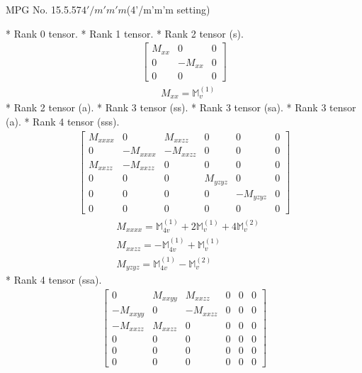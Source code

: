 \documentclass[fleqn,8pt,landscape]{jsarticle}
\begin{document}
\setcounter{MaxMatrixCols}{32}

\renewcommand{\tablename}{Table~}
\renewcommand{\figurename}{Figure~}
\begin{center}
\LARGE
MPG No. 15.5.57\quad$4'/m'm'm$\quad(4'/m'm'm setting)
\end{center}
* Rank 0 tensor.
* Rank 1 tensor.
* Rank 2 tensor (s).
\begin{align*}
\begin{bmatrix} M_{xx} & 0 & 0 \\ 0 & - M_{xx} & 0 \\ 0 & 0 & 0 \end{bmatrix}
\end{align*}
\begin{align*}
& M_{xx} = \mathbb{M}_{v}^{(1)}
\end{align*}
* Rank 2 tensor (a).
* Rank 3 tensor (ss).
* Rank 3 tensor (sa).
* Rank 3 tensor (a).
* Rank 4 tensor (sss).
\begin{align*}
\begin{bmatrix} M_{xxxx} & 0 & M_{xxzz} & 0 & 0 & 0 \\ 0 & - M_{xxxx} & - M_{xxzz} & 0 & 0 & 0 \\ M_{xxzz} & - M_{xxzz} & 0 & 0 & 0 & 0 \\ 0 & 0 & 0 & M_{yzyz} & 0 & 0 \\ 0 & 0 & 0 & 0 & - M_{yzyz} & 0 \\ 0 & 0 & 0 & 0 & 0 & 0 \end{bmatrix}
\end{align*}
\begin{align*}
& M_{xxxx} = \mathbb{M}_{4v}^{(1)} + 2 \mathbb{M}_{v}^{(1)} + 4 \mathbb{M}_{v}^{(2)} \\
& M_{xxzz} = - \mathbb{M}_{4v}^{(1)} + \mathbb{M}_{v}^{(1)} \\
& M_{yzyz} = \mathbb{M}_{4v}^{(1)} - \mathbb{M}_{v}^{(2)}
\end{align*}
* Rank 4 tensor (ssa).
\begin{align*}
\begin{bmatrix} 0 & M_{xxyy} & M_{xxzz} & 0 & 0 & 0 \\ - M_{xxyy} & 0 & - M_{xxzz} & 0 & 0 & 0 \\ - M_{xxzz} & M_{xxzz} & 0 & 0 & 0 & 0 \\ 0 & 0 & 0 & 0 & 0 & 0 \\ 0 & 0 & 0 & 0 & 0 & 0 \\ 0 & 0 & 0 & 0 & 0 & 0 \end{bmatrix}
\end{align*}
\end{document}
